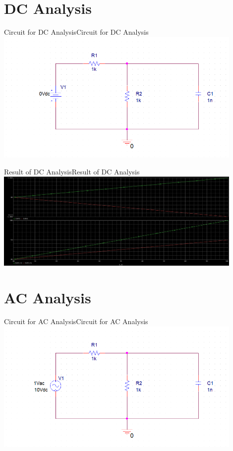 \documentclass[12pt]{../manual}
\begin{document}
\section{DC Analysis}
\begin{myfigure}[colback=white,label=fig:dc]{Circuit for DC Analysis}{Circuit for DC Analysis}
\includegraphics[width=0.9\textwidth]{figures/DCAnalysisCircuitCrop.PNG}
\end{myfigure}

\begin{myfigure}[label=fig:dcAnalRes]{Result of DC Analysis}{Result of DC Analysis}
\includegraphics[width=0.9\textwidth]{figures/ResultDCAnalysisCrop.PNG}
\end{myfigure}

\newpage
\section{AC Analysis}
\begin{myfigure}[colback=white,label=fig:ac]{Circuit for AC Analysis}{Circuit for AC Analysis}
\includegraphics[width=0.9\textwidth]{figures/ACAnalysisCircuitCrop.PNG}
\end{myfigure}
\end{document}
